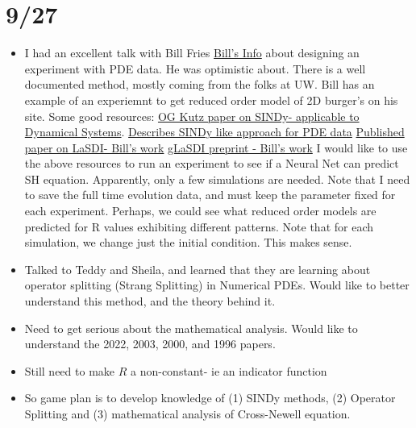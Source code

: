 \documentclass[12pt]{article}
\begin{document}
\section{9/27}
\begin{itemize}
    \item 
        I had an excellent talk with Bill Fries \href{https://sites.google.com/view/frieswd}{Bill's Info} about designing an experiment with PDE data. He was optimistic about. There is a well documented method, mostly coming from the folks at UW. Bill has an example of an experiemnt to get reduced order model of 2D burger's on his site.\newline
    Some good resources:\newline
    \href{https://www.pnas.org/doi/pdf/10.1073/pnas.1517384113}{OG Kutz paper on SINDy- applicable to Dynamical Systems}.\newline
    \href{https://www.pnas.org/doi/pdf/10.1073/pnas.1906995116}{Describes SINDy like approach for PDE data}\newline
    \href{https://reader.elsevier.com/reader/sd/pii/S0045782522004807?token=828D185F06DE28418D9E46B544E846EEDC227470A1436A8191877A3EC18DC832E4B81EE95D31BCC28E5B0B0B7D00373C&originRegion=us-east-1&originCreation=20220928051957}{Published paper on LaSDI- Bill's work}\newline
    \href{https://arxiv.org/pdf/2204.12005.pdf}{gLaSDI preprint - Bill's work}\newline
    I would like to use the above resources to run an experiment to see if a Neural Net can predict SH equation. Apparently, only a few simulations are needed. Note that I need to save the full time evolution data, and must keep the parameter fixed for each experiment. Perhaps, we could see what reduced order models are predicted for R values exhibiting different patterns. Note that for each simulation, we change just the initial condition. This makes sense.
\item Talked to Teddy and Sheila, and learned that they are learning about operator splitting (Strang Splitting) in Numerical PDEs. Would like to better understand this method, and the theory behind it.
\item Need to get serious about the mathematical analysis. Would like to understand the 2022, 2003, 2000, and 1996 papers.
\item Still need to make $R$ a non-constant- ie an indicator function
\item So game plan is to develop knowledge of (1) SINDy methods, (2) Operator Splitting and (3) mathematical analysis of Cross-Newell equation.
\end{itemize}
\end{document}
